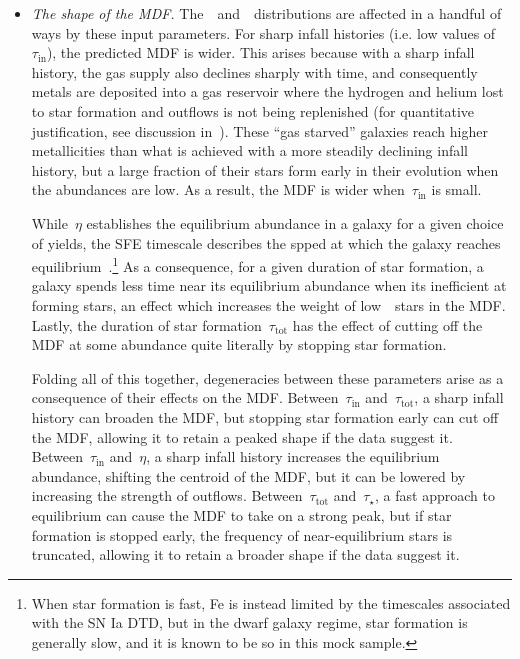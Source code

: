 \documentclass[ms.tex]{subfiles}
\begin{document}
\begin{itemize}
\begin{itemize}
		\item \textit{The shape of the MDF.}
		The~\ah~and~\feh~distributions are affected in a handful of ways by
		these input parameters.
		For sharp infall histories (i.e. low values of~$\tau_\text{in}$), the
		predicted MDF is wider.
		This arises because with a sharp infall history, the gas supply also
		declines sharply with time, and consequently metals are deposited into
		a gas reservoir where the hydrogen and helium lost to star formation
		and outflows is not being replenished (for quantitative justification,
		see discussion in~\citealp{Weinberg2017}).
		These ``gas starved'' galaxies reach higher metallicities than what is
		achieved with a more steadily declining infall history, but a large
		fraction of their stars form early in their evolution when the
		abundances are low.
		As a result, the MDF is wider when~$\tau_\text{in}$ is small.
		\par
		While~$\eta$ establishes the equilibrium abundance in a galaxy for a
		given choice of yields, the SFE timescale describes the spped at which
		the galaxy reaches equilibrium~\citep{Weinberg2017}.\footnote{
			When star formation is fast, Fe is instead limited by the
			timescales associated with the SN Ia DTD, but in the dwarf galaxy
			regime, star formation is generally slow, and it is known to be so
			in this mock sample.
		}
		As a consequence, for a given duration of star formation, a galaxy
		spends less time near its equilibrium abundance when its inefficient at
		forming stars, an effect which increases the weight of low~\feh~stars
		in the MDF.
		Lastly, the duration of star formation~$\tau_\text{tot}$ has the effect
		of cutting off the MDF at some abundance quite literally by stopping
		star formation.
		\par
		Folding all of this together, degeneracies between these parameters
		arise as a consequence of their effects on the MDF.
		Between~$\tau_\text{in}$ and~$\tau_\text{tot}$, a sharp infall history
		can broaden the MDF, but stopping star formation early can cut off the
		MDF, allowing it to retain a peaked shape if the data suggest it.
		Between~$\tau_\text{in}$ and~$\eta$, a sharp infall history increases
		the equilibrium abundance, shifting the centroid of the MDF, but it can
		be lowered by increasing the strength of outflows.
		Between~$\tau_\text{tot}$ and~$\tau_\star$, a fast approach to
		equilibrium can cause the MDF to take on a strong peak, but if star
		formation is stopped early, the frequency of near-equilibrium stars is
		truncated, allowing it to retain a broader shape if the data suggest it.
	\end{itemize}


\end{itemize}
\end{document}
